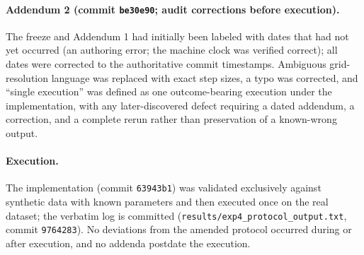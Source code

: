 \documentclass[11pt]{article}
\begin{document}
\paragraph{Addendum 2 (commit \texttt{be30e90}; audit corrections before
execution).} The freeze and Addendum 1 had initially been labeled with dates
that had not yet occurred (an authoring error; the machine clock was verified
correct); all dates were corrected to the authoritative commit timestamps.
Ambiguous grid-resolution language was replaced with exact step sizes, a typo
was corrected, and ``single execution'' was defined as one outcome-bearing
execution under the implementation, with any later-discovered defect requiring
a dated addendum, a correction, and a complete rerun rather than preservation
of a known-wrong output.

\paragraph{Execution.} The implementation (commit \texttt{63943b1}) was
validated exclusively against synthetic data with known parameters and then
executed once on the real dataset; the verbatim log is committed
(\texttt{results/exp4\_protocol\_output.txt}, commit \texttt{9764283}). No
deviations from the amended protocol occurred during or after execution, and no
addenda postdate the execution.
\end{document}
